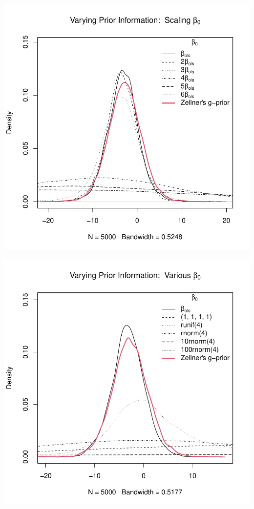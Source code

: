 \documentclass[12pt, a4paper]{article}
\begin{document}
\includegraphics{Thesis_v1-023}

\includegraphics{Thesis_v1-024}
\end{document}

